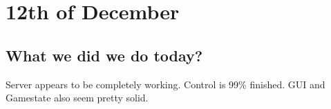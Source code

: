\section{12th of December}
\subsection{What we did we do today?}
Server appears to be completely working. Control is 99\% finished. GUI and Gamestate also seem pretty solid.
